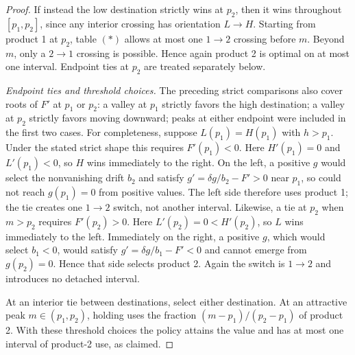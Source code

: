 \documentclass[11pt]{article}
\begin{document}
\begin{proof}
If instead the low destination strictly wins at $p_2$, then it wins throughout $[p_1,p_2]$, since any interior crossing has orientation $L\to H$. Starting from product 1 at $p_2$, table $(*)$ allows at most one $1\to2$ crossing before $m$. Beyond $m$, only a $2\to1$ crossing is possible. Hence again product 2 is optimal on at most one interval. Endpoint ties at $p_2$ are treated separately below.

\begin{figure}[H]
\centering
{}
\end{figure}


\medskip\noindent\textit{Endpoint ties and threshold choices.}
The preceding strict comparisons also cover roots of $F'$ at $p_1$ or
$p_2$: a valley at $p_1$ strictly favors the high destination; a valley at
$p_2$ strictly favors moving downward; peaks at either endpoint were
included in the first two cases.
For completeness, suppose $L(p_1)=H(p_1)$ with $h>p_1$.
Under the stated strict shape this requires $F'(p_1)<0$.
Here $H'(p_1)=0$ and $L'(p_1)<0$, so $H$ wins immediately to the right.
On the left, a positive $g$ would select the nonvanishing drift $b_2$ and
satisfy $g'=\delta g/b_2-F'>0$ near $p_1$, so could not reach
$g(p_1)=0$ from positive values. The left side therefore uses product 1;
the tie creates one $1\to2$ switch, not another interval.
Likewise, a tie at $p_2$ when $m>p_2$ requires $F'(p_2)>0$.
Here $L'(p_2)=0<H'(p_2)$, so $L$ wins immediately to the left.
Immediately on the right, a positive $g$, which would select $b_1<0$,
would satisfy $g'=\delta g/b_1-F'<0$ and cannot emerge from
$g(p_2)=0$. Hence that side selects product 2. Again the switch is
$1\to2$ and introduces no detached interval.

At an interior tie between destinations, select either destination.
At an attractive peak $m\in(p_1,p_2)$, holding uses the fraction
$(m-p_1)/(p_2-p_1)$ of product 2. With these threshold choices the policy
attains the value and has at most one interval of product-2 use, as claimed.
\end{proof}
\end{document}
